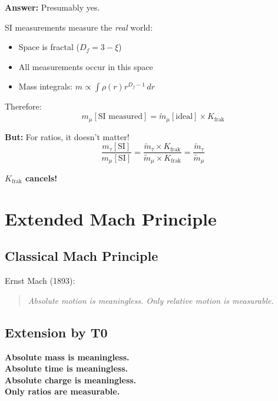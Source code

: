 \textbf{Answer:} Presumably yes.

SI measurements measure the \textit{real} world:
\begin{itemize}[nosep]
	\item Space is fractal ($D_f = 3 - \xi$)
	\item All measurements occur in this space
	\item Mass integrals: $m \propto \int \rho(r) r^{D_f-1} \, dr$
\end{itemize}

Therefore:
\begin{equation}
	m_\mu[\text{SI measured}] = \tilde{m}_\mu[\text{ideal}] \times K_\text{frak}
\end{equation}

\textbf{But:} For ratios, it doesn't matter!
\begin{equation}
	\frac{m_\tau[\text{SI}]}{m_\mu[\text{SI}]} = \frac{\tilde{m}_\tau \times K_\text{frak}}{\tilde{m}_\mu \times K_\text{frak}} = \frac{\tilde{m}_\tau}{\tilde{m}_\mu}
\end{equation}

\textbf{$K_\text{frak}$ cancels!}

\section{Extended Mach Principle}

\subsection{Classical Mach Principle}

Ernst Mach (1893):
\begin{quote}
	\textit{Absolute motion is meaningless. Only relative motion is measurable.}
\end{quote}

\subsection{Extension by T0}

\begin{theorem}
	\textbf{Absolute mass is meaningless.} \\
	\textbf{Absolute time is meaningless.} \\
	\textbf{Absolute charge is meaningless.} \\
	\textbf{Only ratios are measurable.}
\end{theorem}

